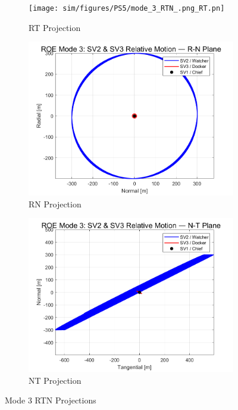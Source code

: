 \begin{figure}[H]
    \centering
    \begin{subfigure}[b]{0.32\linewidth}
        \texttt{[image: sim/figures/PS5/mode\_3\_RTN\_.png\_RT.pn]}
        \caption{RT Projection}
        \label{fig:mode_3_rt}
    \end{subfigure}
    \begin{subfigure}[b]{0.32\linewidth}
        \includegraphics[width=\linewidth]{sim/figures/PS5/mode_3_RTN.png_RN.png}
        \caption{RN Projection}
        \label{fig:mode_3_rn}
    \end{subfigure}
    \begin{subfigure}[b]{0.32\linewidth}
        \includegraphics[width=\linewidth]{sim/figures/PS5/mode_3_RTN.png_NT.png}
        \caption{NT Projection}
        \label{fig:mode_3_nt}
    \end{subfigure}
    \caption{Mode 3 RTN Projections}
    \label{fig:mode_3_rtn}
\end{figure}

